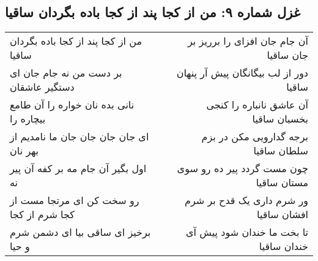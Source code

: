 \begin{center}
\section*{غزل شماره ۹: من از کجا پند از کجا باده بگردان ساقیا}
\label{sec:0009}
\begin{longtable}{l p{0.5cm} r}
من از کجا پند از کجا باده بگردان ساقیا
&&
آن جام جان افزای را برریز بر جان ساقیا
\\
بر دست من نه جام جان ای دستگیر عاشقان
&&
دور از لب بیگانگان پیش آر پنهان ساقیا
\\
نانی بده نان خواره را آن طامع بیچاره را
&&
آن عاشق نانباره را کنجی بخسبان ساقیا
\\
ای جان جان جان جان ما نامدیم از بهر نان
&&
برجه گدارویی مکن در بزم سلطان ساقیا
\\
اول بگیر آن جام مه بر کفه آن پیر نه
&&
چون مست گردد پیر ده رو سوی مستان ساقیا
\\
رو سخت کن ای مرتجا مست از کجا شرم از کجا
&&
ور شرم داری یک قدح بر شرم افشان ساقیا
\\
برخیز ای ساقی بیا ای دشمن شرم و حیا
&&
تا بخت ما خندان شود پیش آی خندان ساقیا
\\
\end{longtable}
\end{center}
